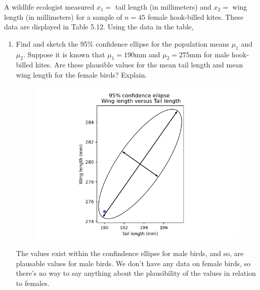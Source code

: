 A wildlife ecologist measured $x_{1} =$ tail length (in millimeters) and $x_{2} =$ wing length (in millimeters) for a sample of $n = 45$ female hook-billed kites.
These data are displayed in Table 5.12.
Using the data in the table,

\begin{enumerate}[label= (\alph*)]
    \item Find and sketch the 95\% confidence ellipse for the population means $\mu_{1}$ and $\mu_{2}$.
    Suppose it is known that $\mu_{1} = 190 \text{mm}$ and $\mu_{2} = 275 \text{mm}$ for male hook-billed kites. 
    Are these plausible values for the mean tail length and mean wing length for
    the female birds?
    Explain.

    \begin{figure}[H]
        \centering
        \includegraphics[scale=0.65]{./python/chapter-5/Question-5-20-a.png}
    \end{figure}

    The values exist within the confindence ellipse for male birds, and so, are plausable values for male birds.
    We don't have any data on female birds, so there's no way to say anything about the plausibility of the values in relation to females.


\end{enumerate}
